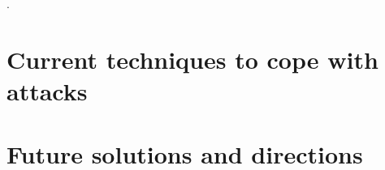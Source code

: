 \documentclass[twocolumn]{article}
\begin{document}
\cite{al2019zero}.


\section{Current techniques to cope with attacks}




\textcolor{red}{\lipsum[1]}






\section{Future solutions and directions}






\textcolor{red}{\lipsum[1]}









\renewcommand{\refname}{REFERENCES}


\end{document}
